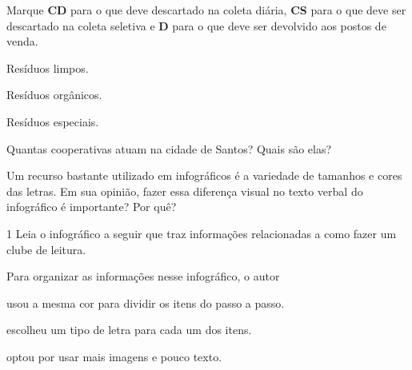 \begin{escolha}
\begin{escolha}
\begin{escolha}
\item Marque \textbf{CD} para o que deve descartado na coleta diária,
\textbf{CS} para o que deve ser descartado na coleta seletiva e \textbf{D}
para o que deve ser devolvido aos postos de venda.

\begin{boxlist}
\boxlist[\rosa{CS}] Resíduos limpos.

\boxlist[\rosa{CD}] Resíduos orgânicos.

\boxlist[\rosa{D}] Resíduos especiais.
\end{boxlist}

\item Quantas cooperativas atuam na cidade de Santos? Quais são elas?


\item Um recurso bastante utilizado em infográficos é a variedade de
tamanhos e cores das letras. Em sua opinião, fazer essa diferença visual
no texto verbal do infográfico é importante? Por quê?

\end{escolha}


\num{1} Leia o infográfico a seguir que traz informações relacionadas a
como fazer um clube de leitura.



Para organizar as informações nesse infográfico, o autor

\begin{boxlist}
\item usou a mesma cor para dividir os itens do passo a passo.

\item escolheu um tipo de letra para cada um dos itens.

\item optou por usar mais imagens e pouco texto.


\end{boxlist}
\end{escolha}
\end{escolha}
